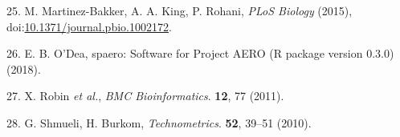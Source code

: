 \documentclass[3p]{elsarticle} %
\begin{document}
\leavevmode\hypertarget{ref-Martinez-Bakker2015}{}%
25. M. Martinez-Bakker, A. A. King, P. Rohani, \emph{PLoS Biology}
(2015),
doi:\href{https://doi.org/10.1371/journal.pbio.1002172}{10.1371/journal.pbio.1002172}.

\leavevmode\hypertarget{ref-ODea2018}{}%
26. E. B. O'Dea, spaero: Software for Project AERO (R package version
0.3.0) (2018).

\leavevmode\hypertarget{ref-Robin2011}{}%
27. X. Robin \emph{et al.}, \emph{BMC Bioinformatics}. \textbf{12}, 77
(2011).

\leavevmode\hypertarget{ref-Shmueli2010}{}%
28. G. Shmueli, H. Burkom, \emph{Technometrics}. \textbf{52}, 39--51
(2010).
\end{document}

